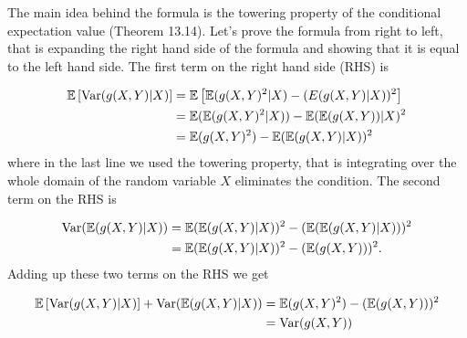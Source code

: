 
The main idea behind the formula is the towering property of the conditional expectation value
(Theorem 13.14). Let's prove the formula from right to left, that is expanding the right hand side
of the formula and showing that it is equal to the left hand side.
The first term on the right hand side (RHS) is 

\begin{align*}
    \mathbb{E} \left[ \mathrm{Var}(g(X,Y) | X) \right]  &= \mathbb{E}  \left[  \mathbb{E}(g(X,Y)^2|X) - (E(g(X,Y)|X))^2 \right] \\
					&= \mathbb{E}( \mathbb{E} (g(X,Y)^2|X))- \mathbb{E}( \mathbb{E}(g(X,Y))|X)^2\\
					&= \mathbb{E}(g(X,Y)^2) - \mathbb{E} (\mathbb{E}(g(X,Y)|X))^2\\
\end{align*}
where in the last line we used the towering property, that is integrating over the whole domain of
the random variable $ X$ eliminates the condition.
The second term on the RHS is

\begin{align*}
    \mathrm{Var}( \mathbb{E}(g(X,Y)|X)) &= \mathbb{E}(\mathbb{E}(g(X,Y)|X))^2 - (\mathbb{E}(\mathbb{E}(g(X,Y)|X)))^2\\
			&= \mathbb{E}(\mathbb{E}(g(X,Y)|X))^2 - (\mathbb{E} (g(X,Y)))^2.
\end{align*}
Adding up these two terms on the RHS we get 

\begin{align*}
    \mathbb{E} \left[ \mathrm{Var}(g(X,Y) | X) \right] + \mathrm{Var}( \mathbb{E}(g(X,Y)|X)) &= \mathbb{E}(g(X,Y)^2) - (\mathbb{E} (g(X,Y)))^2\\
							     &= \mathrm{Var}(g(X,Y))
\end{align*}

